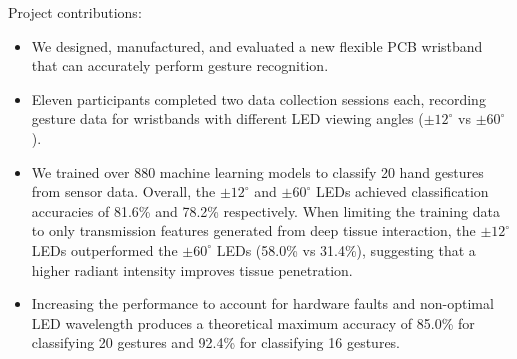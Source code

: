\documentclass[ oneside,%
                    author={Jack Jarvis},
                    degree={BSc},
                     title={FlexIR: Flexible PCB Wristbands for Infrared Based Gesture Recognition},
                    unit={COMS30045},
                    subtitle={Investigating the Effect of LED Viewing Angle on Gesture Classification in Infrared Sensing Systems}]{dissertation}
\begin{document}
Project contributions:
\noindent
\begin{itemize}
    \item We designed, manufactured, and evaluated a new flexible PCB wristband that can accurately perform gesture recognition.
    \item Eleven participants completed two data collection sessions each, recording gesture data for wristbands with different LED viewing angles ($\pm 12^\circ$ vs $\pm 60^\circ$).
    \item We trained over 880 machine learning models to classify 20 hand gestures from sensor data. Overall, the $\pm 12^\circ$ and $\pm 60^\circ$ LEDs achieved classification accuracies of 81.6\% and 78.2\% respectively. When limiting the training data to only transmission features generated from deep tissue interaction, the $\pm 12^\circ$ LEDs outperformed the $\pm 60^\circ$ LEDs (58.0\% vs 31.4\%), suggesting that a higher radiant intensity improves tissue penetration.
    \item Increasing the performance to account for hardware faults and non-optimal LED wavelength produces a theoretical maximum accuracy of 85.0\% for classifying 20 gestures and 92.4\% for classifying 16 gestures.
\end{itemize}




\end{document}
